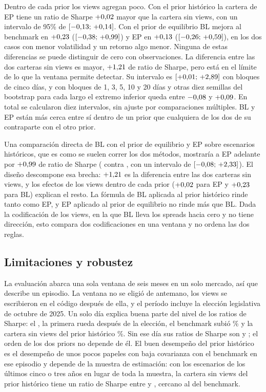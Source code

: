 \documentclass[11pt]{article}
\begin{document}
Dentro de cada prior los views agregan poco. Con el prior hist\'orico la
cartera de EP tiene un ratio de Sharpe $+0{,}02$ mayor que la cartera
sin views, con un intervalo de 95\% de $[-0{,}13;\, +0{,}14]$. Con el
prior de equilibrio BL mejora al benchmark en $+0{,}23$
($[-0{,}38;\, +0{,}99]$) y EP en $+0{,}13$
($[-0{,}26;\, +0{,}59]$), en los dos casos con menor volatilidad y
un retorno algo menor. Ninguna de estas diferencias se puede distinguir de
cero con \nDays{} observaciones. La diferencia entre las dos carteras sin
views es mayor, $+1{,}21$ de ratio de Sharpe, pero est\'a en el
l\'imite de lo que la ventana permite detectar. Su intervalo es
$[+0{,}01;\, +2{,}89]$ con bloques de cinco d\'ias, y con
bloques de 1, 3, 5, 10 y 20 d\'ias y otras diez semillas del bootstrap para
cada largo el extremo inferior
queda entre $-0{,}08$ y $+0{,}09$. En total se calcularon
diez intervalos, sin ajuste por comparaciones m\'ultiples. BL y EP est\'an
m\'as cerca entre s\'i dentro de un prior que cualquiera de los dos de su
contraparte con el otro prior.

Una comparaci\'on directa de BL con el prior de equilibrio y EP sobre
escenarios hist\'oricos, que es como se suelen correr los dos m\'etodos,
mostrar\'ia a EP adelante por $+0{,}99$ de ratio de Sharpe (\nShEP{}
contra \nShBL, con un intervalo de $[-0{,}08;\, +2{,}33]$). El
dise\~no descompone esa brecha: $+1{,}21$ es la diferencia entre las
dos carteras sin views, y los efectos de los views dentro de cada prior
($+0{,}02$ para EP y $+0{,}23$ para BL) explican el resto. La
f\'ormula de BL aplicada al prior hist\'orico rinde tanto como EP, y EP
aplicado al prior de equilibrio no rinde m\'as que BL. Dada la codificaci\'on
de los views, en la que BL lleva los spreads hacia cero y no tiene
direcci\'on, esto compara dos codificaciones en una ventana y no ordena las
dos reglas.

\subsection{Limitaciones y robustez}\label{sec:limitations}

La evaluaci\'on abarca una sola ventana de seis meses en un solo mercado, as\'i que
describe un episodio. La ventana no se eligi\'o de antemano, los views se
escribieron en el c\'odigo despu\'es de ella, y el per\'iodo incluye la elecci\'on
legislativa de octubre de 2025. Un solo d\'ia explica buena parte del nivel
de los ratios de Sharpe: el \nExtDay, la primera rueda despu\'es de la
elecci\'on, el benchmark subi\'o \nExtBench\% y la cartera sin views del prior
hist\'orico \nExtMVhist\%. Sin ese d\'ia sus ratios de Sharpe son
\nShBenchEx{} y \nShMVhistEx; el orden de los dos priors no depende de
\'el. El buen desempe\~no del prior hist\'orico es
el desempe\~no de unos pocos papeles con baja covarianza con el benchmark en
ese episodio y depende de la muestra de estimaci\'on: con los escenarios de
los \'ultimos cinco o tres a\~nos en lugar de toda la muestra, la cartera sin
views del prior hist\'orico tiene un ratio de Sharpe entre \nShWinNVmin{} y
\nShWinNVmax, cercano al del benchmark.
\end{document}
